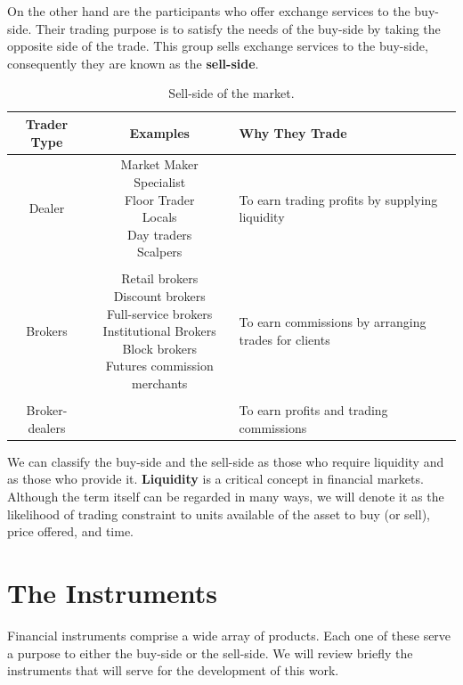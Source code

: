 \documentclass[../TGMAFFIRO]{subfiles}
\begin{document}
%
 On the other hand are the participants who offer exchange services to the buy-side. Their trading purpose is to satisfy the needs of the buy-side by taking the opposite side of the trade. This group sells exchange services to the buy-side, consequently they are known as the \textbf{sell-side}.\\

\begin{table}[h!]
    \centering
    \begin{tabular}{c c m{3cm}}
    	\hline
    	Trader Type & Examples & Why They Trade \\
    	\hline
    	Dealer & \breakcell{Market Maker \\ Specialist \\ Floor Trader \\ Locals \\ Day traders \\ Scalpers} & {To earn trading profits by supplying liquidity} \\
    	\\  	
    	Brokers & \breakcell{Retail brokers \\ Discount brokers \\ Full-service brokers \\ Institutional Brokers \\ Block brokers \\ Futures commission merchants} & {To earn commissions by arranging trades for clients} \\
    	\\
    	Broker-dealers & \breakcell{Wirehouses} & {To earn profits and trading commissions} \\
    	\hline
    \end{tabular}
    \caption{Sell-side of the market. }
\end{table}

We can classify the buy-side and the sell-side as those who require liquidity and as those who provide it. \textbf{Liquidity} is a critical concept in financial markets. Although the term itself can be regarded in many ways, we will denote it as the likelihood of trading constraint to units available of the asset to buy (or sell), price offered, and time.

\section{The Instruments}
Financial instruments comprise a wide array of products. Each one of these serve a purpose to either the buy-side or the sell-side. We will review briefly the instruments that will serve for the development of this work.
\end{document}
